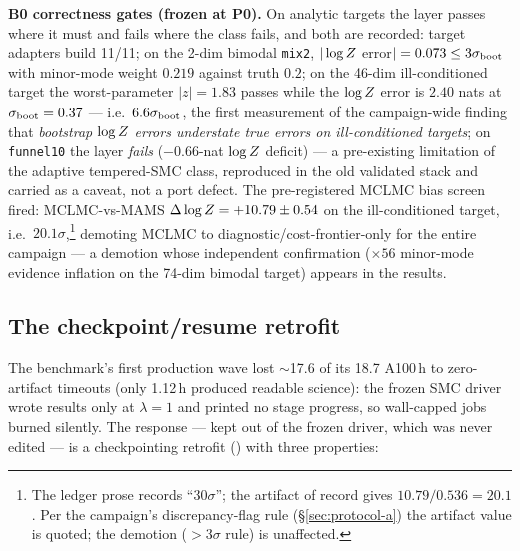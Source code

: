 \textbf{B0 correctness gates (frozen at P0).} On analytic targets the
layer passes where it must and fails where the class fails, and both are
recorded: target adapters build 11/11; on
the 2-dim bimodal \texttt{mix2}, $|\log Z$ error$|=0.073\le3\sigma_{\mathrm{boot}}$ with
minor-mode weight $0.219$ against truth $0.2$; on the 46-dim
ill-conditioned target the worst-parameter $|z|=1.83$ passes while the
$\log Z$ error is $2.40$ nats at $\sigma_{\mathrm{boot}}=0.37$ --- i.e.\ $6.6\sigma_{\rm
boot}$, the first measurement of the campaign-wide finding that
\emph{bootstrap $\log Z$ errors understate true errors on ill-conditioned
targets}; on \texttt{funnel10} the layer \emph{fails} ($-0.66$-nat $\log Z$
deficit) --- a pre-existing limitation of the adaptive tempered-SMC class,
reproduced in the old validated stack and carried as a caveat, not a port
defect. The pre-registered MCLMC bias screen fired: MCLMC-vs-MAMS
$\Delta\log Z=+10.79\pm0.54$ on the ill-conditioned target, i.e.\
$20.1\sigma$,\footnote{The ledger prose records ``$30\sigma$''; the
artifact of record \dfile{data/smc\_b0\_report.json} gives
$10.79/0.536=20.1$. Per the campaign's discrepancy-flag rule
(\S\ref{sec:protocol-a}) the artifact value is quoted; the demotion
($>3\sigma$ rule) is unaffected.} demoting MCLMC to
diagnostic/cost-frontier-only for the entire campaign --- a demotion whose
independent confirmation ($\times56$ minor-mode evidence inflation on the
74-dim bimodal target) appears in the results.

\subsection{The checkpoint/resume retrofit}
\label{sec:ckpt-a}

The benchmark's first production wave lost $\sim$17.6 of its 18.7
A100\,h to zero-artifact timeouts (only 1.12\,h produced readable
science): the frozen SMC driver wrote results only at
$\lambda=1$ and printed no stage progress, so wall-capped jobs burned
silently. The response --- kept out of the frozen driver, which was never
edited --- is a checkpointing retrofit
() with three properties:

